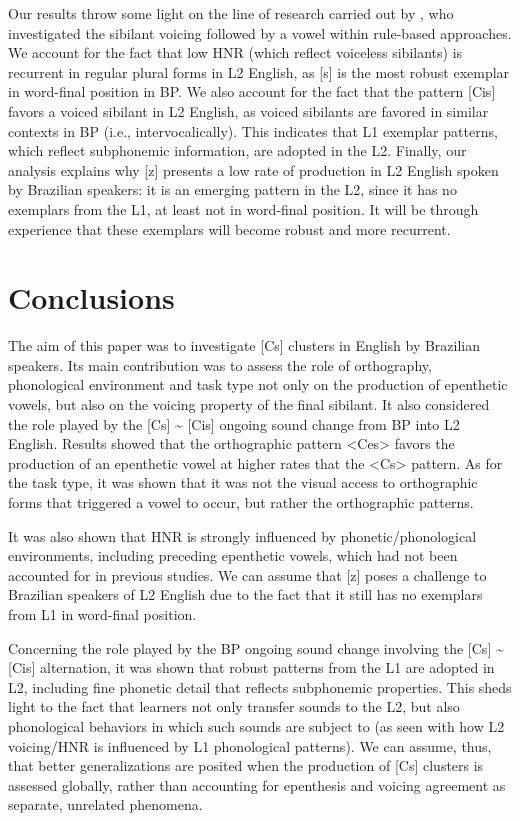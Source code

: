 Our results throw some light on the line of research carried out by
, who investigated the sibilant voicing
followed by a vowel within rule-based approaches. We account for the
fact that low HNR (which reflect voiceless sibilants) is recurrent in
regular plural forms in L2 English, as {[}s{]} is the most robust
exemplar in word-final position in BP. We also account for the fact that
the pattern {[}Cis{]} favors a voiced sibilant in L2 English, as voiced
sibilants are favored in similar contexts in BP (i.e., intervocalically). 
This indicates that L1 exemplar patterns, which
reflect subphonemic information, are adopted in the L2. Finally, our
analysis explains why {[}z{]} presents a low rate of production in L2
English spoken by Brazilian speakers: it is an emerging pattern in the
L2, since it has no exemplars from the L1, at least not in word-final
position. It will be through experience that these exemplars will become
robust and more recurrent.



\section{Conclusions}
The aim of this paper was to investigate {[}Cs{]} clusters in English by
Brazilian speakers. Its main contribution was to assess the role of
orthography, phonological environment and task type not only on the
production of epenthetic vowels, but also on the voicing property of the
final sibilant. It also considered the role played by the {[}Cs{]}
\textasciitilde{} {[}Cis{]} ongoing sound change from BP into L2
English. Results showed that the orthographic pattern
\textless Ces\textgreater{} favors the production of an epenthetic vowel
at higher rates that the \textless Cs\textgreater{} pattern. As for the
task type, it was shown that it was not the visual access to
orthographic forms that triggered a vowel to occur, but rather the
orthographic patterns.

It was also shown that HNR is strongly influenced by
phonetic/phonological environments, including preceding epenthetic
vowels, which had not been accounted for in previous studies. We can
assume that {[}z{]} poses a challenge to Brazilian speakers of L2
English due to the fact that it still has no exemplars from L1 in
word-final position.

Concerning the role played by the BP ongoing sound change involving the
{[}Cs{]} \textasciitilde{} {[}Cis{]} alternation, it was shown that
robust patterns from the L1 are adopted in L2, including fine phonetic
detail that reflects subphonemic properties. This sheds light to the
fact that learners not only transfer sounds to the L2, but also
phonological behaviors in which such sounds are subject to (as seen with
how L2 voicing/HNR is influenced by L1 phonological patterns). We can
assume, thus, that better generalizations are posited when the
production of {[}Cs{]} clusters is assessed globally, rather than
accounting for epenthesis and voicing agreement as separate, unrelated
phenomena.






